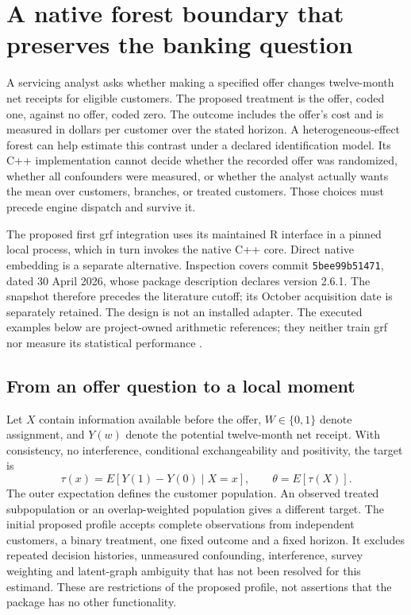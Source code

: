 \section{A native forest boundary that preserves the banking question}
\label{exec13:grf-adapter}

A servicing analyst asks whether making a specified offer changes
twelve-month net receipts for eligible customers. The proposed treatment
is the offer, coded one, against no offer, coded zero. The outcome
includes the offer's cost and is measured in dollars per customer over
the stated horizon. A heterogeneous-effect forest can help estimate this
contrast under a declared identification model. Its C++ implementation
cannot decide whether the recorded offer was randomized, whether all
confounders were measured, or whether the analyst actually wants the
mean over customers, branches, or treated customers. Those choices must
precede engine dispatch and survive it.

The proposed first grf integration uses its maintained R interface in a
pinned local process, which in turn invokes the native C++ core. Direct
native embedding is a separate alternative. Inspection covers commit
\texttt{5bee99b51471}, dated 30 April 2026, whose package description
declares version 2.6.1. The snapshot therefore precedes the literature
cutoff; its October acquisition date is separately retained. The design
is not an installed adapter. The executed examples below are
project-owned arithmetic references; they neither train grf nor measure
its statistical performance
\cite{exec13_grf_runtime,exec13_grf_design,exec13_grf_oracle}.

\subsection{From an offer question to a local moment}

Let \(X\) contain information available before the offer,
\(W\in\{0,1\}\) denote assignment, and \(Y(w)\) denote the potential
twelve-month net receipt. With consistency, no interference, conditional
exchangeability and positivity, the target is \[
 \tau(x)=E[Y(1)-Y(0)\mid X=x],\qquad
 \theta=E[\tau(X)].
\] The outer expectation defines the customer population. An observed
treated subpopulation or an overlap-weighted population gives a
different target. The initial proposed profile accepts complete
observations from independent customers, a binary treatment, one fixed
outcome and a fixed horizon. It excludes repeated decision histories,
unmeasured confounding, interference, survey weighting and latent-graph
ambiguity that has not been resolved for this estimand. These are
restrictions of the proposed profile, not assertions that the package
has no other functionality.

